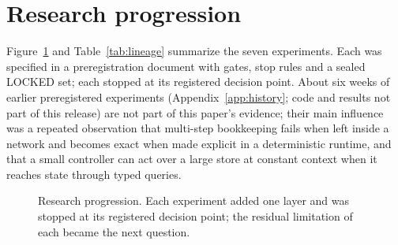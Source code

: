 \documentclass[10pt]{article}
\begin{document}
\section{Research progression}\label{sec:lineage}

Figure~\ref{fig:progression} and Table~\ref{tab:lineage} summarize the seven experiments. Each was specified in a preregistration document with gates, stop rules and a sealed LOCKED set; each stopped at its registered decision point. About six weeks of earlier preregistered experiments (Appendix~\ref{app:history}; code and results not part of this release) are not part of this paper's evidence; their main influence was a repeated observation that multi-step bookkeeping fails when left inside a network and becomes exact when made explicit in a deterministic runtime, and that a small controller can act over a large store at constant context when it reaches state through typed queries.

\begin{figure}[t]
\centering
\resizebox{\linewidth}{!}{}
\caption{Research progression. Each experiment added one layer and was stopped at its registered decision point; the residual limitation of each became the next question.}
\label{fig:progression}
\end{figure}
\end{document}
